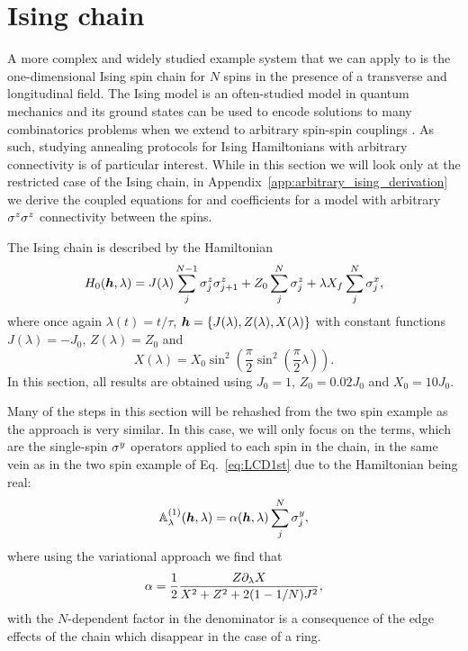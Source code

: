 \section{Ising chain}\label{sec:5.2_Ising_chain}

A more complex and widely studied example system that we can apply  to is the one-dimensional Ising spin chain for $N$ spins in the presence of a transverse and longitudinal field. The Ising model is an often-studied model in quantum mechanics and its ground states can be used to encode solutions to many combinatorics problems when we extend to arbitrary spin-spin couplings \cite{mohseni_ising_2022, ebadi_quantum_2022, pichler_quantum_2018}. As such, studying annealing protocols for Ising Hamiltonians with arbitrary connectivity is of particular interest. While in this section we will look only at the restricted case of the Ising chain, in Appendix~\ref{app:arbitrary_ising_derivation} we derive the coupled equations for  and   coefficients for a model with arbitrary $\sigma^z\sigma^z$ connectivity between the spins.

The Ising chain is described by the Hamiltonian
\begin{equation}\label{eq:ising_chain_hamiltonian}
    H_0(\boldsymbol{h},\lambda) = J(\lambda) \sum_{j}^{N-1} \sigma^z_j \sigma^z_{j+1} + Z_0\sum_j^N \sigma^z_j + \lambda X_f \sum_j^N \sigma^x_j,
\end{equation}
where once again $\lambda(t) = t/\tau$, $\boldsymbol{h} = \{ J(\lambda), Z(\lambda), X(\lambda) \}$ with constant functions $J(\lambda) = -J_0$, $Z(\lambda) = Z_0$ and
\begin{equation}
    X(\lambda) = X_0 \sin^2\left(\frac{\pi}{2} \sin^2 \left( \frac{\pi}{2} \lambda \right) \right).
\end{equation}
In this section, all results are obtained using $J_0 = 1$, $Z_0 = 0.02J_0$ and $X_0 = 10J_0$.

Many of the steps in this section will be rehashed from the two spin example as the approach is very similar. In this case, we will only focus on the   terms, which are the single-spin $\sigma^y$ operators applied to each spin in the chain, in the same vein as in the two spin example  of Eq.~\eqref{eq:LCD1st} due to the Hamiltonian being real:
\begin{equation}\label{eq:ising_fo_agp}
    \mathbb{A}_{\lambda}^{(1)}(\boldsymbol{h}, \lambda) = \alpha(\boldsymbol{h}, \lambda) \sum_{j}^N\sigma^y_j,
\end{equation}
where using the variational  approach we find that 
\begin{equation}
    \alpha = \frac{1}{2} \frac{Z \partial_{\lambda} X}{X^2 + Z^2 + 2(1 - 1/N)J^2},
\end{equation}
with the $N$-dependent factor in the denominator is a consequence of the edge effects of the chain which disappear in the case of a ring. 

